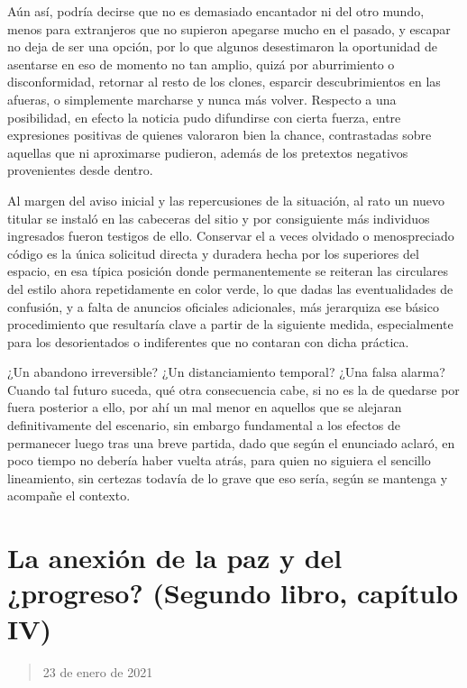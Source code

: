 \documentclass[
]{book}
\begin{document}
Aún así, podría decirse que no es demasiado encantador ni del otro mundo, menos para extranjeros que no supieron apegarse mucho en el pasado, y escapar no deja de ser una opción, por lo que algunos desestimaron la oportunidad de asentarse en eso de momento no tan amplio, quizá por aburrimiento o disconformidad, retornar al resto de los clones, esparcir descubrimientos en las afueras, o simplemente marcharse y nunca más volver. Respecto a una posibilidad, en efecto la noticia pudo difundirse con cierta fuerza, entre expresiones positivas de quienes valoraron bien la chance, contrastadas sobre aquellas que ni aproximarse pudieron, además de los pretextos negativos provenientes desde dentro.

Al margen del aviso inicial y las repercusiones de la situación, al rato un nuevo titular se instaló en las cabeceras del sitio y por consiguiente más individuos ingresados fueron testigos de ello. Conservar el a veces olvidado o menospreciado código es la única solicitud directa y duradera hecha por los superiores del espacio, en esa típica posición donde permanentemente se reiteran las circulares del estilo ahora repetidamente en color verde, lo que dadas las eventualidades de confusión, y a falta de anuncios oficiales adicionales, más jerarquiza ese básico procedimiento que resultaría clave a partir de la siguiente medida, especialmente para los desorientados o indiferentes que no contaran con dicha práctica.

¿Un abandono irreversible? ¿Un distanciamiento temporal? ¿Una falsa alarma? Cuando tal futuro suceda, qué otra consecuencia cabe, si no es la de quedarse por fuera posterior a ello, por ahí un mal menor en aquellos que se alejaran definitivamente del escenario, sin embargo fundamental a los efectos de permanecer luego tras una breve partida, dado que según el enunciado aclaró, en poco tiempo no debería haber vuelta atrás, para quien no siguiera el sencillo lineamiento, sin certezas todavía de lo grave que eso sería, según se mantenga y acompañe el contexto.

\hypertarget{la-anexiuxf3n-de-la-paz-y-del-progreso-segundo-libro-capuxedtulo-iv}{%
\section{La anexión de la paz y del ¿progreso? (Segundo libro, capítulo IV)}\label{la-anexiuxf3n-de-la-paz-y-del-progreso-segundo-libro-capuxedtulo-iv}}

\begin{quote}
23 de enero de 2021
\end{quote}
\end{document}
